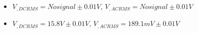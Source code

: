 \begin{itemize}
     \item $V_{, DCRMS}=No signal\pm 0.01\unit{V}$, $V_{, ACRMS}=No signal\pm 0.01\unit{V}$ 
     \item $V_{, DCRMS}=15.8V\pm 0.01\unit{V}$, $V_{, ACRMS}=189.1mV\pm 0.01\unit{V}$\\
\end{itemize}